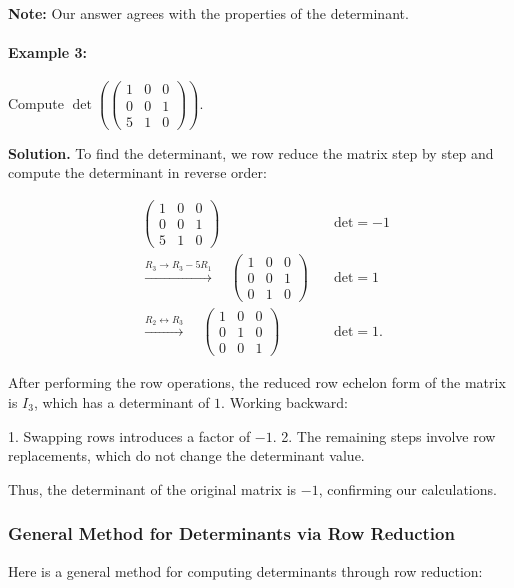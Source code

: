 \documentclass[a4paper,12pt]{article}
\begin{document}
\noindent\textbf{Note:} Our answer agrees with the properties of the determinant.

\paragraph*{Example 3:}
\noindent Compute \(\det\left(\begin{pmatrix} 1 & 0 & 0 \\ 0 & 0 & 1 \\ 5 & 1 & 0 \end{pmatrix}\right)\).

\textbf{Solution.} To find the determinant, we row reduce the matrix step by step and compute the determinant in reverse order:

\[
\begin{aligned}
&\begin{pmatrix} 1 & 0 & 0 \\ 0 & 0 & 1 \\ 5 & 1 & 0 \end{pmatrix} \quad &\text{det} = -1 \\
&\xrightarrow{R_3 \to R_3 - 5R_1} \quad \begin{pmatrix} 1 & 0 & 0 \\ 0 & 0 & 1 \\ 0 & 1 & 0 \end{pmatrix} \quad &\text{det} = 1 \\
&\xrightarrow{R_2 \leftrightarrow R_3} \quad \begin{pmatrix} 1 & 0 & 0 \\ 0 & 1 & 0 \\ 0 & 0 & 1 \end{pmatrix} \quad &\text{det} = 1.
\end{aligned}
\]

\noindent After performing the row operations, the reduced row echelon form of the matrix is \(I_3\), which has a determinant of \(1\). Working backward:

1. Swapping rows introduces a factor of \(-1\).
2. The remaining steps involve row replacements, which do not change the determinant value.

Thus, the determinant of the original matrix is \(-1\), confirming our calculations.

\subsubsection*{General Method for Determinants via Row Reduction}
\noindent Here is a general method for computing determinants through row reduction:
\end{document}
